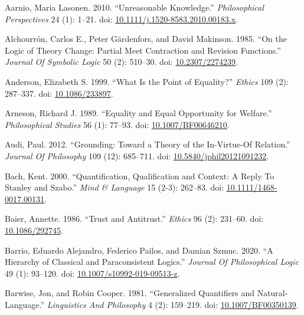 \documentclass[
  10pt,
  letterpaper,
  DIV=11,
  numbers=noendperiod,
  twoside]{scrartcl}
\newlength{\cslhangindent}
\newenvironment{CSLReferences}[2] %
 {\begin{list}{}{%
  \setlength{\itemindent}{0pt}
  \setlength{\leftmargin}{0pt}
  \setlength{\parsep}{0pt}
  \ifodd #1
   \setlength{\leftmargin}{\cslhangindent}
   \setlength{\itemindent}{-1\cslhangindent}
  \fi
  \setlength{\itemsep}{#2\baselineskip}}}
 {\end{list}}
\begin{document}
\label{refs}
\begin{CSLReferences}{1}{0}
Aarnio, Maria Lasonen. 2010. {``Unreasonable Knowledge.''}
\emph{Philosophical Perspectives} 24 (1): 1--21. doi:
\href{https://doi.org/10.1111/j.1520-8583.2010.00183.x}{10.1111/j.1520-8583.2010.00183.x}.

Alchourrón, Carlos E., Peter Gärdenfors, and David Makinson. 1985. {``On
the Logic of Theory Change: Partial Meet Contraction and Revision
Functions.''} \emph{Journal Of Symbolic Logic} 50 (2): 510--30. doi:
\href{https://doi.org/10.2307/2274239}{10.2307/2274239}.

Anderson, Elizabeth S. 1999. {``What Is the Point of Equality?''}
\emph{Ethics} 109 (2): 287--337. doi:
\href{https://doi.org/10.1086/233897}{10.1086/233897}.

Arneson, Richard J. 1989. {``Equality and Equal Opportunity for
Welfare.''} \emph{Philosophical Studies} 56 (1): 77--93. doi:
\href{https://doi.org/10.1007/BF00646210}{10.1007/BF00646210}.

Audi, Paul. 2012. {``Grounding: Toward a Theory of the In-Virtue-Of
Relation.''} \emph{Journal Of Philosophy} 109 (12): 685--711. doi:
\href{https://doi.org/10.5840/jphil20121091232}{10.5840/jphil20121091232}.

Bach, Kent. 2000. {``Quantification, Qualification and Context: A Reply
To Stanley and Szabo.''} \emph{Mind \& Language} 15 (2-3): 262--83. doi:
\href{https://doi.org/10.1111/1468-0017.00131}{10.1111/1468-0017.00131}.

Baier, Annette. 1986. {``Trust and Antitrust.''} \emph{Ethics} 96 (2):
231--60. doi: \href{https://doi.org/10.1086/292745}{10.1086/292745}.

Barrio, Eduardo Alejandro, Federico Pailos, and Damian Szmuc. 2020. {``A
Hierarchy of Classical and Paraconsistent Logics.''} \emph{Journal Of
Philosophical Logic} 49 (1): 93--120. doi:
\href{https://doi.org/10.1007/s10992-019-09513-z}{10.1007/s10992-019-09513-z}.

Barwise, Jon, and Robin Cooper. 1981. {``Generalized Quantifiers and
Natural-Language.''} \emph{Linguistics And Philosophy} 4 (2): 159--219.
doi: \href{https://doi.org/10.1007/BF00350139}{10.1007/BF00350139}.


\end{CSLReferences}
\end{document}
